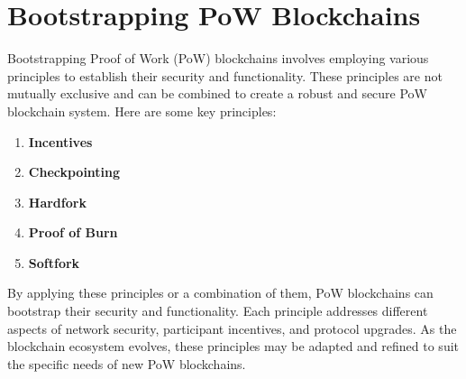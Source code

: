 \documentclass{report}
\begin{document}
\section{Bootstrapping PoW Blockchains}
Bootstrapping Proof of Work (PoW) blockchains involves employing various principles to establish their security and functionality. These principles are not mutually exclusive and can be combined to create a robust and secure PoW blockchain system. Here are some key principles:
\begin{enumerate}
	\item \textbf{Incentives}
	\item \textbf{Checkpointing}
	\item \textbf{Hardfork}
	\item \textbf{Proof of Burn}
	\item \textbf{Softfork}
\end{enumerate}
By applying these principles or a combination of them, PoW blockchains can bootstrap their security and functionality. Each principle addresses different aspects of network security, participant incentives, and protocol upgrades. As the blockchain ecosystem evolves, these principles may be adapted and refined to suit the specific needs of new PoW blockchains.
\end{document}
